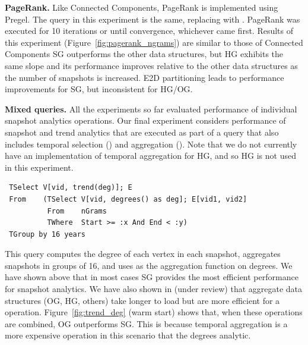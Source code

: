 
{\bf PageRank.} Like Connected Components, PageRank is implemented
using Pregel.  The query in this experiment is the same, replacing
 with .  PageRank was executed for
10 iterations or until convergence, whichever came first.  Results of
this experiment (Figure~\ref{fig:pagerank_ngrams}) are similar to
those of Connected Components SG outperforms the other data
structures, but HG exhibits the same slope and its performance
improves relative to the other data structures as the number of
snapshots is increased.  E2D partitioning leads to performance
improvements for SG, but inconsistent for HG/OG.


{\bf Mixed queries.} All the experiments so far evaluated performance
of individual \ql snapshot analytics operations.  Our final experiment
considers performance of snapshot and trend analytics that are
executed as part of a query that also includes temporal selection
() and aggregation ().  Note that we do
not currently have an implementation of temporal aggregation for HG,
and so HG is not used in this experiment.

\begin{small}
\begin{verbatim}
 TSelect V[vid, trend(deg)]; E
 From    (TSelect V[vid, degrees() as deg]; E[vid1, vid2]
          From    nGrams
          TWhere  Start >= :x And End < :y)
 TGroup by 16 years
\end{verbatim}
\end{small}

This query computes the degree of each vertex in each snapshot,
aggregates snapshots in groups of 16, and uses  as the
aggregation function on degrees.  We have shown above that in most
cases SG provides the most efficient performance for snapshot
analytics.  We have also shown in (under review) that aggregate data
structures (OG, HG, others) take longer to load but are more efficient
for a  operation.  Figure~\ref{fig:trend_deg} (warm
start) shows that, when these operations are combined, OG outperforms
SG.  This is because temporal aggregation is a more expensive
operation in this scenario that the degrees analytic.


